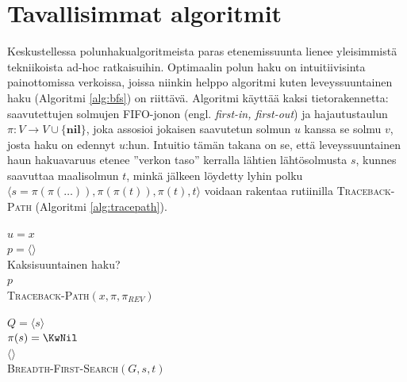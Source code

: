 \documentclass[finnish]{tktltiki2}
\newenvironment{finalgo}[1][htb]{
  \renewcommand{\algorithmcfname}{Algoritmi}
  \begin{algorithm}[#1]
}{\end{algorithm}}
\let\oldnl\nl%
\newcommand{\nonl}{\renewcommand{\nl}{\let\nl\oldnl}}
\theoremstyle{definition}
\theoremstyle{remark}
\begin{document}
\section{Tavallisimmat algoritmit}
Keskustellessa polunhakualgoritmeista paras etenemissuunta lienee yleisimmistä tekniikoista ad-hoc ratkaisuihin. Optimaalin polun haku on intuitiivisinta painottomissa verkoissa, joissa niinkin helppo algoritmi kuten leveyssuuntainen haku (Algoritmi \ref{alg:bfs}) on riittävä. Algoritmi käyttää kaksi tietorakennetta: saavutettujen solmujen FIFO-jonon (engl. \textit{first-in, first-out}) ja hajautustaulun $\pi \colon V \to V \cup \{ \textbf{nil} \}$, joka assosioi jokaisen saavutetun solmun $u$ kanssa se solmu $v$, josta haku on edennyt $u$:hun. Intuitio tämän takana on se, että leveyssuuntainen haun hakuavaruus etenee ''verkon taso'' kerralla lähtien lähtösolmusta $s$, kunnes saavuttaa maalisolmun $t$, minkä jälkeen löydetty lyhin polku $\langle s = \pi(\pi(\dots)), \pi(\pi(t)), \pi(t), t \rangle$ voidaan rakentaa rutiinilla \textsc{Traceback-Path} (Algoritmi \ref{alg:tracepath}).
\begin{finalgo}
$u = x$ \\
$p = \langle  \rangle$ \\
\nonl Kaksisuuntainen haku? \\
\KwRet $p$ \\
\caption{\textsc{Traceback-Path}$(x, \pi, \pi_{REV})$}
\label{alg:tracepath}
\end{finalgo}

\begin{finalgo}
  $Q = \langle s \rangle$ \\
  $\pi(s) = \KwNil$ \\
  \KwRet $\langle \rangle$ \\
\caption{\textsc{Breadth-First-Search}$(G, s, t)$}
\label{alg:bfs}
\end{finalgo}
\end{document}
